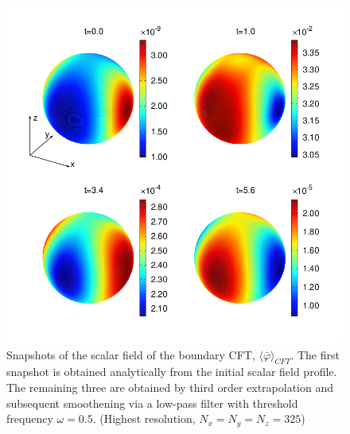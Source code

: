 \documentclass[a4paper,11pt]{article}
\numberwithin{equation}{section}
\begin{document}

\begin{figure}[!h]
        \centering
        \includegraphics[width=5.0in,clip=true]{plots/bdyplots/L3/bdyphi/sphereplots_bdyphi_L3_2by2.png}
\parbox{5.0in}{\caption{Snapshots of the scalar field of the boundary CFT, $\langle \bar{\varphi}\rangle_{CFT}$. The first snapshot is obtained analytically from the initial scalar field profile. The remaining three are obtained by third order extrapolation and subsequent smoothening via a low-pass filter with threshold frequency $\omega=0.5$. (Highest resolution, $N_x=N_y=N_z=325$)
        }\label{fig:snapshotsbdyphi}}
\end{figure}
\end{document}
